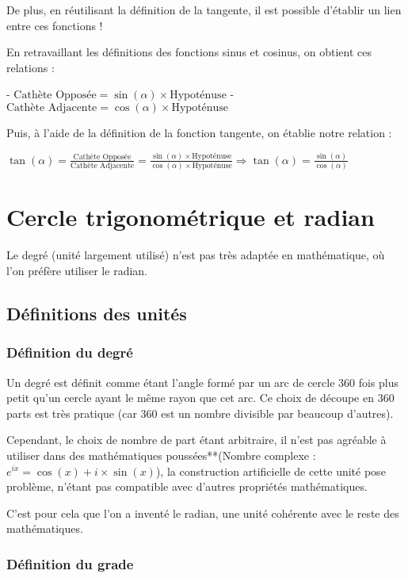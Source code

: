 \documentclass[a4paper]{article}
\begin{document}
			De plus, en réutilisant la définition de la tangente, il est possible d'établir un lien entre ces fonctions !

			En retravaillant les définitions des fonctions sinus et cosinus, on obtient ces relations :

			- $\text{Cathète Opposée} = \sin(\alpha) \times \text{Hypoténuse}$
			- $\text{Cathète Adjacente} = \cos(\alpha) \times \text{Hypoténuse}$

			Puis, à l'aide de la définition de la fonction tangente, on établie notre relation :

			$\tan(\alpha) = \frac{\text{Cathète Opposée}}{\text{Cathète Adjacente}} = \frac{\sin(\alpha) \times \text{Hypoténuse}}{\cos(\alpha) \times \text{Hypoténuse}} \Longrightarrow \tan(\alpha) = \frac{\sin(\alpha)}{\cos(\alpha)}$

	\section{Cercle trigonométrique et radian}

		Le degré (unité largement utilisé) n'est pas très adaptée en mathématique, où l'on préfère utiliser le radian.

		\subsection{Définitions des unités}

			\subsubsection{Définition du degré}

				Un degré est définit comme étant l'angle formé par un arc de cercle 360 fois plus petit qu'un cercle ayant le même rayon que cet arc. Ce choix de découpe en 360 parts est très pratique (car 360 est un nombre divisible par beaucoup d'autres). 

				Cependant, le choix de nombre de part étant arbitraire, il n'est pas agréable à utiliser dans des mathématiques poussées**(Nombre complexe : $e^{ix}=\cos(x)+i \times \sin(x)$), la construction artificielle de cette unité pose problème, n'étant pas compatible avec d'autres propriétés mathématiques. 

				C'est pour cela que l'on a inventé le radian, une unité cohérente avec le reste des mathématiques.

			\subsubsection{Définition du grade}
\end{document}
